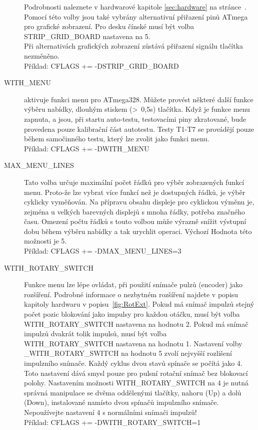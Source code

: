 \begin{description}
Podrobnosti naleznete v hardwarové kapitole \ref{sec:hardware} na stránce~\pageref{sec:hardware}.
Pomocí této volby jsou také vybrány alternativní přiřazení pinů ATmega pro grafické zobrazení.
Pro desku čínské  musí být volba  STRIP\_GRID\_BOARD nastavena na 5.\\
Při alternativách grafických zobrazení zůstává přiřazení signálu tlačítka nezměněno.\\
Příklad: CFLAGS += -DSTRIP\_GRID\_BOARD
  \item[WITH\_MENU] aktivuje funkci menu pro ATmega328. Můžete provést některé další funkce 
výběru nabídky, dlouhým stiskem (\textgreater~0,5s) tlačítka.
Když je funkce menu zapnuta, a jsou, při startu auto-testu, testovacími piny zkratované,
bude provedena pouze kalibrační část autotestu.
Testy T1-T7 se provádějí pouze během samočinného testu, který lze zvolit jako funkci menu.\\
Příklad: CFLAGS += -DWITH\_MENU
 \item[MAX\_MENU\_LINES]
Tato volba určuje maximální počet řádků pro výběr zobrazených funkcí menu.
Proto-že lze vybrat více funkcí než je dostupných řádků, je výběr cyklicky vyměňován.
Na přípravu obsahu displeje pro cyklickou výměnu je, zejména u velkých barevných displejů
s mnoha řádky, potřeba značného času.
Omezení počtu řádků s touto volbou může výrazně snížit výstupní dobu během výběru nabídky
a tak urychlit operaci.
Výchozí Hodnota této možnosti je 5.\\
Příklad: CFLAGS += -DMAX\_MENU\_LINES=3
  \item[WITH\_ROTARY\_SWITCH]  Funkce menu lze lépe ovládat, při použití snímače pulzů (encoder) jako rozšíření.
Podrobné informace o nezbytném rozšíření najdete v popisu kapitoly hardwaru v popisu~\ref{fig:RotExt}.
Pokud má snímač impulzů stejný počet pozic blokování jako impulsy pro každou otáčku, musí být
volba WITH\_ROTARY\_SWITCH nastavena na hodnotu 2.
Pokud má snímač impulzů dvakrát tolik impulsů, musí být volba WITH\_ROTARY\_SWITCH nastavena na hodnotu 1.
Nastavení volby \_WITH\_ROTARY\_SWITCH na hodnotu 5 zvolí nejvyšší rozlišení impulzního snímače.
Každý cyklus dvou stavů spínače se počítá jako 4.
Toto nastavení  dává smysl pouze pro pulsní rotační snímač bez blokovací polohy.
Nastavením možnosti WITH\_ROTARY\_SWITCH na 4 je nutná správná manipulace se dvěma oddělenými
tlačítky, nahoru (Up) a dolů (Down), instalované namísto dvou spínačů impulzního snímače.
Nepoužívejte nastavení 4 s normálními snímači impulzů!\\
Příklad: CFLAGS += -DWITH\_ROTARY\_SWITCH=1

\end{description}
